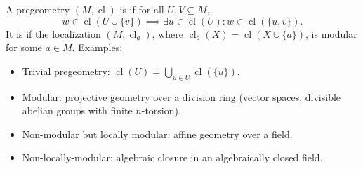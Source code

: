 A pregeometry $(M, \operatorname{cl})$ is  if for all $U, V \subseteq M$,
$$w \in \operatorname{cl}(U \cup \{v\}) \implies \exists u \in \operatorname{cl}(U) : w \in \operatorname{cl}(\{u, v\}).$$
It is  if the localization $(M, \operatorname{cl}_a)$, where $\operatorname{cl}_a(X) = \operatorname{cl}(X \cup \{a\})$, is modular for some $a \in M$.
Examples:
\begin{itemize}
\item Trivial pregeometry: $\operatorname{cl}(U) = \bigcup_{u \in U} \operatorname{cl}(\{u\})$.
\item Modular: projective geometry over a division ring (vector spaces, divisible abelian groups with finite $n$-torsion).
\item Non-modular but locally modular: affine geometry over a field.
\item Non-locally-modular: algebraic closure in an algebraically closed field.
\end{itemize}
